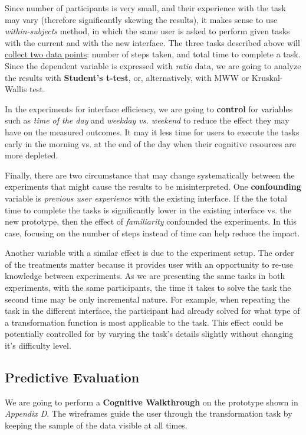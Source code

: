 \documentclass[12pt,letterpaper]{article}
\begin{document}
\bigskip
Since number of participants is very small, and their experience with the task may vary (therefore significantly skewing the results), it makes sense to use \textit{within-subjects} method, in which the same user is asked to perform given tasks with the current and with the new interface. The three tasks described above will \underline{collect two data points}: number of steps taken, and total time to complete a task. Since the dependent variable is expressed with \textit{ratio} data, we are going to analyze the results with \textbf{Student's t-test}, or, alternatively, with MWW or Kruskal-Wallis test. 

In the experiments for interface efficiency, we are going to \textbf{control} for variables such as \textit{time of the day} and \textit{weekday vs. weekend} to reduce the effect they may have on the measured outcomes. It may it less time for users to execute the tasks early in the morning vs. at the end of the day when their cognitive resources are more depleted. 

Finally, there are two circumstance that may change systematically between the experiments that might cause the results to be misinterpreted. One \textbf{confounding} variable is \textit{previous user experience} with the existing interface. If the the total time to complete the tasks is significantly lower in the existing interface vs. the new prototype, then the effect of \textit{familiarity}  confounded the experiments. In this case, focusing on the number of steps instead of time can help reduce the impact.

Another variable with a similar effect is due to the experiment setup. The order of the treatments matter because it provides user with an opportunity to re-use knowledge between experiments. As we are presenting the same tasks in both experiments, with the same participants, the time it takes to solve the task the second time may be only incremental nature. For example, when repeating the task in the different interface, the participant had already solved for what type of a transformation function is most applicable to the task. This effect could be potentially controlled for by varying the task's details slightly without changing it's difficulty level.


\subsection*{Predictive Evaluation}

We are going to perform a \textbf{Cognitive Walkthrough} on the prototype shown in \textit{Appendix D}. The wireframes guide the user through the transformation task by keeping the sample of the data visible at all times. 
\end{document}
